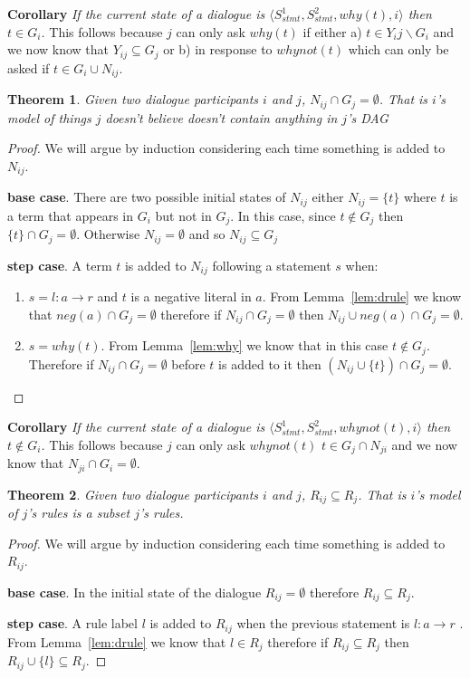 \documentclass{blue-book}
\newtheorem{theorem}{Theorem}
\newcommand{\drule}[3]{\ensuremath{#1:#2 \rightarrow #3}}
\begin{document}
{\bf Corollary} \emph{If the current state of a dialogue is $\langle S^1_{stmt}, S^2_{stmt}, why(t), i\rangle$ then $t \in G_i$.}  This follows because $j$ can only ask $why(t)$ if either a) $t \in Y_ij\backslash G_i$ and we now know that $Y_{ij} \subseteq G_j$ or b) in response to $whynot(t)$ which can only be asked if $t \in G_i \cup N_{ij}$.

\begin{theorem}
\label{thm:Ncorrect}
Given two dialogue participants $i$ and $j$, $N_{ij} \cap G_j = 
\emptyset$.  That is $i$'s model of things $j$ doesn't believe doesn't contain anything in $j$'s DAG
\end{theorem}
\begin{proof}
We will argue by induction considering each time something is added to $N_{ij}$.

{\bf base case}.  There are two possible initial states of $N_{ij}$ either $N_{ij} = \{t\}$ where $t$ is a term that appears in $G_i$ but not in $G_j$.  In this case, since $t \not\in G_j$ then $\{t\} \cap G_j = \emptyset$.  Otherwise $N_{ij} = \emptyset$ and so $N_{ij} \subseteq G_j$

{\bf step case}.  A term $t$ is added to $N_{ij}$ following a statement $s$ when:
\begin{enumerate}
\item $s = \drule{l}{a}{r}$ and $t$ is a negative literal in $a$.  From Lemma~\ref{lem:drule} we know that $neg(a) \cap G_{j} = \emptyset$ therefore if $N_{ij} \cap G_{j} = \emptyset$ then $N_{ij} \cup neg(a) \cap G_{j} = \emptyset$.
\item $s = why(t)$.  From Lemma~\ref{lem:why} we  know that in this case $t \not\in G_j$.  Therefore if $N_{ij} \cap G_{j} = \emptyset$ before $t$ is added to it then $(N_{ij} \cup \{t\}) \cap G_{j} = \emptyset$.
\end{enumerate}
\end{proof}
{\bf Corollary} \emph{If the current state of a dialogue is $\langle S^1_{stmt}, S^2_{stmt}, whynot(t), i\rangle$ then $t \not\in G_i$.}  This follows because $j$ can only ask $whynot(t)$ $t \in G_j \cap N_{ji}$ and we now know that $N_{ji} \cap G_i = \emptyset$.

\begin{theorem}
Given two dialogue participants $i$ and $j$, $R_{ij} \subseteq R_j$.  That is $i$'s model of $j$'s rules is a subset  $j$'s rules.
\end{theorem}
\begin{proof}
We will argue by induction considering each time something is added to $R_{ij}$.

{\bf base case}.  In the initial state of the dialogue $R_{ij} = \emptyset$ therefore $R_{ij} \subseteq R_j$.


{\bf step case}.  A rule label $l$ is added to $R_{ij}$ when the previous statement is $\drule{l}{a}{r}$ .  From Lemma~\ref{lem:drule} we know that $l \in R_j $ therefore if $R_{ij} \subseteq R_{j}$ then $R_{ij} \cup \{l\} \subseteq R_{j}$.
\end{proof}
\end{document}
